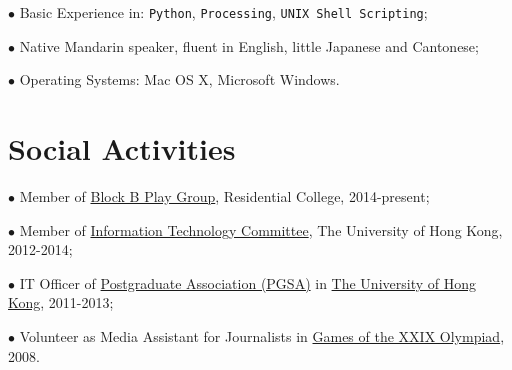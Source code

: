\documentclass[10pt]{article}
\renewcommand{\section}[2]%
        {\pagebreak[2]\vspace{1.3\baselineskip}%
         \phantomsection\addcontentsline{toc}{section}{#1}%
         \hspace{0in}%
         \marginpar{
         \raggedright \scshape #1}#2}
\begin{document}
$\bullet$ Basic Experience in: \texttt{Python}, \texttt{Processing}, \texttt{UNIX Shell Scripting};

$\bullet$ Native Mandarin speaker, fluent in English, little Japanese and Cantonese;

$\bullet$ Operating Systems: Mac OS X, Microsoft Windows.


\section{Social Activities}
$\bullet$ Member of \href{http://hkurcblockb.com}{Block B Play Group}, Residential College, 2014-present;

$\bullet$ Member of \href{http://intraweb.hku.hk/local/its/itc.html}{Information Technology Committee}, The University of Hong Kong, 2012-2014;

$\bullet$ IT Officer of \href{http://www.pgsa.hku.hk/}{Postgraduate Association (PGSA)} in
 \href{http://www.hku.hk/}{The University of Hong Kong}, 2011-2013;

$\bullet$ Volunteer as Media Assistant for Journalists in \href{http://en.wikipedia.org/wiki/2008_Summer_Olympics}{Games of the XXIX Olympiad}, 2008.
\end{document}
